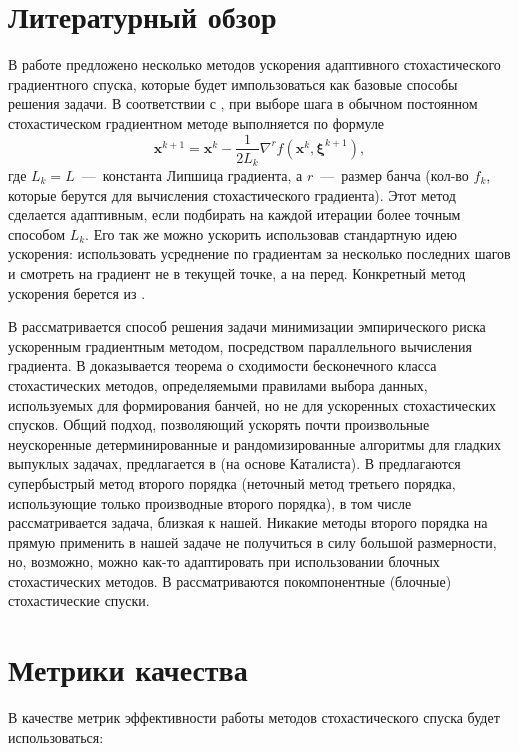 \documentclass[]{scrartcl}
\begin{document}
\section{Литературный обзор}

В работе \cite{Ogaltsov2020} предложено несколько методов ускорения адаптивного стохастического градиентного спуска, которые будет импользоваться как базовые способы решения задачи. В соответствии с \cite{Ogaltsov2020}, при выборе шага в обычном постоянном стохастическом градиентном методе выполняется по формуле
$$\boldsymbol x^{k+1}=\boldsymbol x^k-\frac{1}{2L_k}\nabla^r f(\boldsymbol x^k,\boldsymbol \xi^{k+1}),$$
где $L_k = L$~---~константа Липшица градиента, а $r$~---~размер банча (кол-во $f_k$, которые берутся для вычисления стохастического градиента). Этот метод сделается адаптивным, если подбирать на каждой итерации более точным способом $L_k$. Его так же можно ускорить использовав стандартную идею ускорения: использовать усреднение по градиентам за несколько последних шагов и смотреть на градиент не в текущей точке, а на перед. Конкретный метод ускорения берется из \cite{Ogaltsov2019}.

В \cite{Hendrikx2020} рассматривается способ решения задачи минимизации эмпирического риска ускоренным градиентным методом, посредством параллельного вычисления градиента. В \cite{Gower2019} доказывается теорема о сходимости бесконечного класса стохастических методов, определяемыми правилами выбора данных, используемых для формирования банчей, но не для ускоренных стохастических спусков. Общий подход, позволяющий ускорять почти произвольные неускоренные детерминированные и рандомизированные алгоритмы для гладких выпуклых задачах, предлагается в \cite{Ivanova2020} (на основе Каталиста). В \cite{Kamzolov2020} предлагаются супербыстрый метод второго порядка (неточный метод третьего порядка, использующие только производные второго порядка), в том числе рассматривается задача, близкая к нашей. Никакие методы второго порядка на прямую применить в нашей задаче не получиться в силу большой размерности, но, возможно, можно как-то адаптировать при использовании блочных стохастических методов. В \cite{Nesterov2010} \cite{Peter2011} \cite{Xiao2014} рассматриваются покомпонентные (блочные) стохастические спуски.

\section{Метрики качества}

В качестве метрик эффективности работы методов стохастического спуска будет использоваться: 
\end{document}
